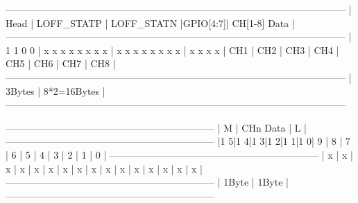 \begin{DoxyVerb} ---------------------------------------------------------------------------------------------------------
 |  Head   |   LOFF_STATP    |   LOFF_STATN    |GPIO[4:7]|                  CH[1-8] Data                 |
 ---------------------------------------------------------------------------------------------------------
 | 1 1 0 0 | x x x x x x x x | x x x x x x x x | x x x x | CH1 | CH2 | CH3 | CH4 | CH5 | CH6 | CH7 | CH8 |
 ---------------------------------------------------------------------------------------------------------
 |                        3Bytes                         |                  8*2=16Bytes                  |
 ---------------------------------------------------------------------------------------------------------

 -----------------------------------------------------------------
 | M |                       CHn Data                        | L |
 -----------------------------------------------------------------
 |1 5|1 4|1 3|1 2|1 1|1 0| 9 | 8 | 7 | 6 | 5 | 4 | 3 | 2 | 1 | 0 |
 -----------------------------------------------------------------
 | x | x | x | x | x | x | x | x | x | x | x | x | x | x | x | x |
 -----------------------------------------------------------------
 |             1Byte             |             1Byte             |
 -----------------------------------------------------------------\end{DoxyVerb}
 

